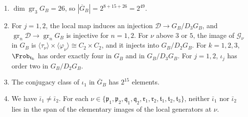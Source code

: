 \begin{lemma}\label{tw:retained-quotient}
\begin{enumerate}
\item[(a)] $\dim\operatorname{gr}_3G_B=26$, so $|\overline G_B|=2^{8+15+26}=2^{49}$.
\item[(b)] For $j=1,2$, the local map induces an injection
 $\mathcal D\to G_B/D_3G_B$, and $\operatorname{gr}_n\mathcal D\to\operatorname{gr}_nG_B$ is
 injective for $n=1,2$. For $\nu$ above $3$ or $5$, the image of
 $\mathcal G_\nu$ in $G_B$ is
 $\langle\tau_\nu\rangle\times\langle\varphi_\nu\rangle\cong C_2\times C_2$,
 and it injects into $G_B/D_2G_B$. For $k=1,2,3$, $\Frob_{\mathfrak t_k}$ has
 order exactly four in $G_B$ and in $G_B/D_3G_B$. For $j=1,2$, $\iota_j$ has
 order two in $G_B/D_2G_B$.
\item[(c)] The conjugacy class of $\iota_1$ in $\overline G_B$ has $2^{15}$
 elements.
\item[(d)] We have $\bar\iota_1\ne\bar\iota_2$. For each
 $\nu\in\{\mathfrak p_1,\mathfrak p_2,\mathfrak q_1,\mathfrak q_2,\mathfrak r_1,\mathfrak r_2,\mathfrak t_1,\mathfrak t_2,\mathfrak t_3\}$,
 neither $\bar\iota_1$ nor $\bar\iota_2$ lies in the span of the elementary
 images of the local generators at $\nu$.
\end{enumerate}
\end{lemma}

